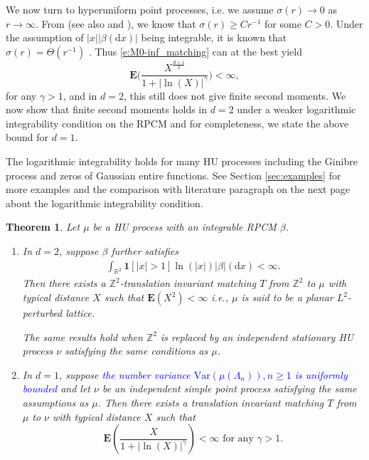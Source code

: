 \documentclass[12pt]{article}
\newtheorem{theorem}{Theorem}
\newcommand{\Z}{\mathbb{Z}}
\newcommand{\1}{\mathbf{1}}
\newcommand{\md}{\mathrm{d}}
\newcommand{\dy}[1]{\textcolor{blue}{#1}}
\newcommand{\dy}[1]{#1}%
\begin{document}
{{We now turn to hyperuniform point processes, i.e. we assume $\sigma(r) \to 0$ as $r \to \infty$. From \cite[Lemma 1.6]{nazarov2012correlation} (see also \cite[Theorem 2A]{beck1987irregularities} and \cite{bjorklund2024hyperuniformity}), we know that $\sigma(r) \geqslant  Cr^{-1}$ for some $ C>0$. Under the assumption of $|x||\beta(\md x)|$ being integrable,     it is known that $\sigma(r) = \Theta(r^{-1})$ \cite[Proposition 2]{martin1980charge}. {Thus \eqref{e:M0-inf_matching} can at the best yield
%
$$ \mathbf{E}\Big( \frac{X^{\frac{d+1}{2}}}{1 + |\ln(X)|^{\gamma}} \Big) < \infty,$$
%
for any $\gamma > 1$,} and in $d  = 2$, this still does not give finite second moments. We now show that {finite second moments holds} in $d=2$ under a weaker logarithmic integrability condition on the RPCM and for completeness, we state the above bound for $d =1$.  {The logarithmic integrability holds for many HU processes including the Ginibre process and zeros of Gaussian entire  functions. See Section \ref{sec:examples} for more examples  {and the comparison with literature paragraph on the next page about the logarithmic integrability condition.}
%
\begin{theorem}
\label{thm:hu}
 {Let $ \mu $ be a HU process with an integrable RPCM $\beta$.}
%
\begin{enumerate}
\item In $d = 2$, suppose $\beta$ further satisfies
%
\begin{align*}\int_{\mathbb{R}^{2}}\mathbf{1}[ | x | >1]\ln( | x | )  | \beta  | (\md x)<\infty.
\end{align*}
%
Then there exists a $\Z^2$-translation invariant matching $T$ from $\Z^2$ to $\mu$ with typical distance $X$ such that $\mathbf{E}(X^{2})<\infty  $ i.e., $ \mu $ is said to be a planar $ L^{2}$-perturbed lattice.

The same results hold when $\mathbb{Z}^{2}$ is replaced by an independent stationary HU process $ \nu $ satisfying the same conditions as $\mu$.

\item In $d = 1$, suppose \dy{the number variance $  \textrm{Var}\left(\mu (\Lambda_n)\right), n \geq 1$ is uniformly bounded}  {and let $\nu$ be an independent simple point process satisfying the same assumptions as $\mu$.  Then there exists a translation invariant matching $T$ from $\mu$ to $\nu$ with typical distance $X$ such that}
%
$$\mathbf{E}\left(\frac{X}{1 + |\ln(X)|^{\gamma}}\right)<\infty \textrm{ for any $\gamma > 1$.}$$
%
\end{enumerate}
%
\end{theorem}

}}}
\end{document}
